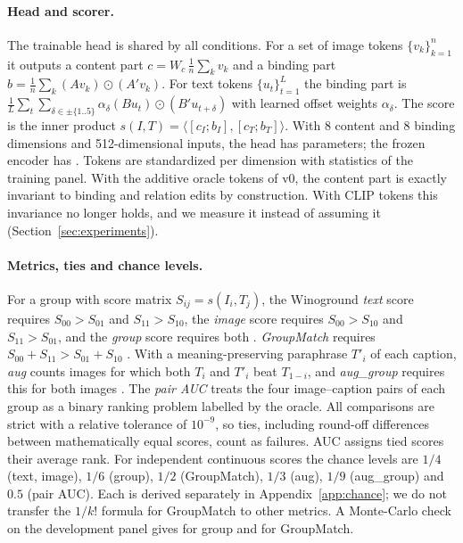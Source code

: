 \paragraph{Head and scorer.}
The trainable head is shared by all conditions. For a set of image tokens $\{v_k\}_{k=1}^{n}$ it
outputs a content part $c = W_c\,\tfrac1n\sum_k v_k$ and a binding part
$b = \tfrac1n\sum_k (A v_k)\odot(A' v_k)$. For text tokens $\{u_t\}_{t=1}^{L}$ the binding part is
$\tfrac1L\sum_t\sum_{\delta\in\pm\{1..5\}}\alpha_\delta (B u_t)\odot(B' u_{t+\delta})$ with learned
offset weights $\alpha_\delta$. The score is the inner product
$s(I,T)=\langle [c_I;b_I],[c_T;b_T]\rangle$. With 8 content and 8 binding dimensions and
512-dimensional inputs, the head has \SPheadParams{} parameters; the frozen encoder has
\SPencParams. Tokens are standardized per dimension with statistics of the training panel.
With the additive oracle tokens of v0, the content part is exactly invariant to binding and relation
edits by construction. With CLIP tokens this invariance no longer holds, and we measure it instead
of assuming it (Section~\ref{sec:experiments}).

\paragraph{Metrics, ties and chance levels.}
For a group with score matrix $S_{ij}=s(I_i,T_j)$, the Winoground \emph{text} score requires
$S_{00}>S_{01}$ and $S_{11}>S_{10}$, the \emph{image} score requires $S_{00}>S_{10}$ and
$S_{11}>S_{01}$, and the \emph{group} score requires both \citep{thrush2022winoground}.
\emph{GroupMatch} requires $S_{00}+S_{11}>S_{01}+S_{10}$ \citep{zhu2025ttm}. With a meaning-preserving
paraphrase $T'_i$ of each caption, \emph{aug} counts images for which both $T_i$ and $T'_i$ beat
$T_{1-i}$, and \emph{aug\_group} requires this for both images \citep[after][]{kamath2024hardpositive}.
The \emph{pair AUC} treats the four image--caption pairs of each group as a binary ranking problem
labelled by the oracle. All comparisons are strict with a relative tolerance of $10^{-9}$, so ties,
including round-off differences between mathematically equal scores, count as failures. AUC
assigns tied scores their average rank. For independent continuous scores the chance levels are
$1/4$ (text, image), $1/6$ (group), $1/2$ (GroupMatch), $1/3$ (aug), $1/9$ (aug\_group) and $0.5$
(pair AUC). Each is derived separately in Appendix~\ref{app:chance}; we do not transfer the $1/k!$
formula for GroupMatch to other metrics. A Monte-Carlo check on the development panel gives
\SPchanceGroupMC{} for group and \SPchanceMatchMC{} for GroupMatch.

